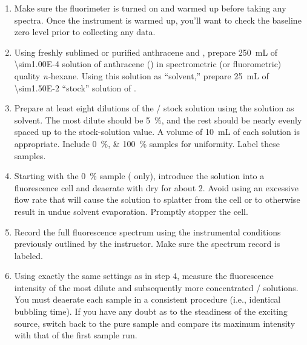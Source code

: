 \begin{enumerate}
	\item Make sure the fluorimeter is turned on and warmed up before taking any spectra. Once the instrument is warmed up, you'll want to check the baseline zero level prior to collecting any data. 
	\item Using freshly sublimed or purified anthracene and , prepare \qty{250}{\mL} of \qty{\sim1.00E-4}{\Molar} solution of anthracene () in spectrometric (or fluorometric) quality \emph{n-}hexane. 
	Using this solution as ``solvent,'' prepare \qty{25}{\mL} of \qty{\sim1.50E-2}{\Molar} ``stock'' solution of .
	\item Prepare at least eight dilutions of the / stock solution using the  solution as solvent.
	The most dilute should be \qty{5}{\percent}, and the rest should be nearly evenly spaced up to the stock-solution value. 
	A volume of \qty{10}{\mL} of each solution is appropriate. 
	Include \SIlist{0;100}{\percent} samples for uniformity. 
	Label these samples.
	\item Starting with the \qty{0}{\percent} sample ( only), introduce the solution into a fluorescence cell and deaerate with dry  for about \qty{2}{\min}. 
	Avoid using an excessive flow rate that will cause the solution to splatter from the cell or to otherwise result in undue solvent evaporation. 
	Promptly stopper the cell.
	\item Record the full fluorescence spectrum using the instrumental conditions previously outlined by the instructor.
	Make sure the spectrum record is labeled.
	\item Using exactly the same settings as in step 4, measure the  fluorescence intensity of the most dilute and subsequently more concentrated / solutions. 
	You must deaerate each sample in a consistent procedure (i.e., identical bubbling time). 
	If you have any doubt as to the steadiness of the exciting source, switch back to the pure  sample and compare its maximum intensity with that of the first sample run.

\end{enumerate}
